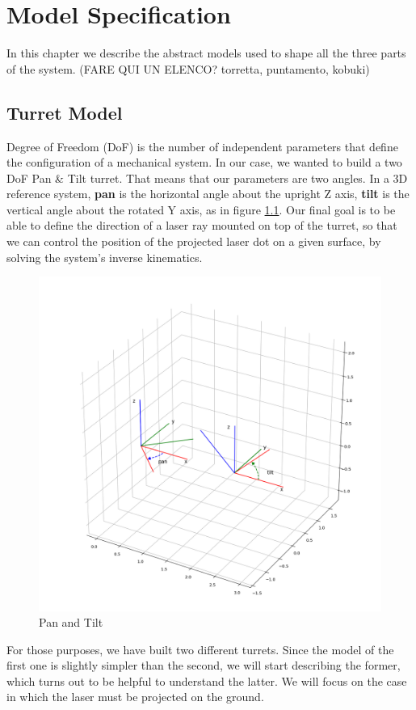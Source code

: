 \chapter{Model Specification}
\label{chap:1} 
In this chapter we describe the abstract models used to shape all the three parts of the system. (FARE QUI UN ELENCO? torretta, puntamento, kobuki)
\section{Turret Model}
Degree of Freedom (DoF) is the number of independent parameters that define the configuration of a mechanical system. In our case, we wanted to build a two DoF Pan \& Tilt turret. That means that our parameters are two angles. In a 3D reference system, \textbf{pan} is the horizontal angle about the upright Z axis, \textbf{tilt} is the vertical angle about the rotated Y axis, as in figure \ref{fig:panTilt}.
Our final goal is to be able to define the direction of a laser ray mounted on top of the turret, so that we can control the position of the projected laser dot on a given surface, by solving the system's inverse kinematics.\\
\begin{figure}
	\centering
	\includegraphics[width=\textwidth]{img/panTilt.png}%
	\caption{Pan and Tilt}
	\label{fig:panTilt}
\end{figure}
For those purposes, we have built two different turrets. Since the model of the first one is slightly simpler than the second, we will start describing the former, which turns out to be helpful to understand the latter. We will focus on the case in which the laser must be projected on the ground.

